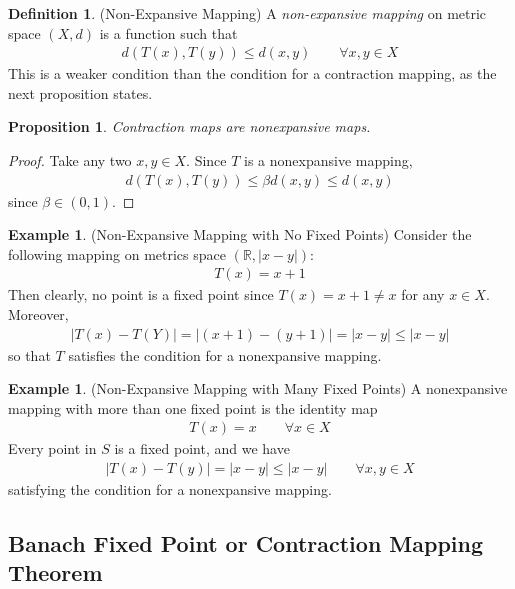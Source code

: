 \documentclass[12pt]{article}
\numberwithin{equation}{section} %
\theoremstyle{plain}
\newtheorem{prop}[thm]{Proposition}
\theoremstyle{definition}
\newtheorem{defn}[thm]{Definition}
\newtheorem{ex}[thm]{Example}
\theoremstyle{remark}
\newcommand{\R}{\mathbb{R}}
\begin{document}
\begin{defn}(Non-Expansive Mapping)
A \emph{non-expansive mapping} on metric space $(X,d)$ is a function
such that
\begin{align*}
  d(T(x),T(y)) \leq d(x,y)
  \qquad\forall x,y\in X
\end{align*}
This is a weaker condition than the condition for a contraction mapping,
as the next proposition states.
\end{defn}

\begin{prop}
Contraction maps are nonexpansive maps.
\end{prop}
\begin{proof}
Take any two $x,y\in X$. Since $T$ is a nonexpansive mapping,
\begin{align*}
  d(T(x),T(y)) \leq \beta d(x,y) \leq d(x,y)
\end{align*}
since $\beta \in (0,1)$.
\end{proof}

\begin{ex}(Non-Expansive Mapping with No Fixed Points)
Consider the following mapping on metrics space $(\R,|x-y|)$:
\begin{align*}
  T(x) = x+1
\end{align*}
Then clearly, no point is a fixed point since $T(x)=x+1\neq x$
for any $x\in X$. Moreover,
\begin{align*}
  |T(x)-T(Y)| = |(x+1)-(y+1)| = |x-y|\leq |x-y|
\end{align*}
so that $T$ satisfies the condition for a nonexpansive mapping.
\end{ex}

\begin{ex}(Non-Expansive Mapping with Many Fixed Points)
A nonexpansive mapping with more than one fixed point is the
identity map
\begin{align*}
  T(x) = x
  \qquad \forall x\in X
\end{align*}
Every point in $S$ is a fixed point, and we have
\begin{align*}
  |T(x)-T(y)| = |x-y| \leq |x-y|
  \qquad\forall x,y\in X
\end{align*}
satisfying the condition for a nonexpansive mapping.
\end{ex}

\clearpage
\subsection{Banach Fixed Point or Contraction Mapping Theorem}
\end{document}
